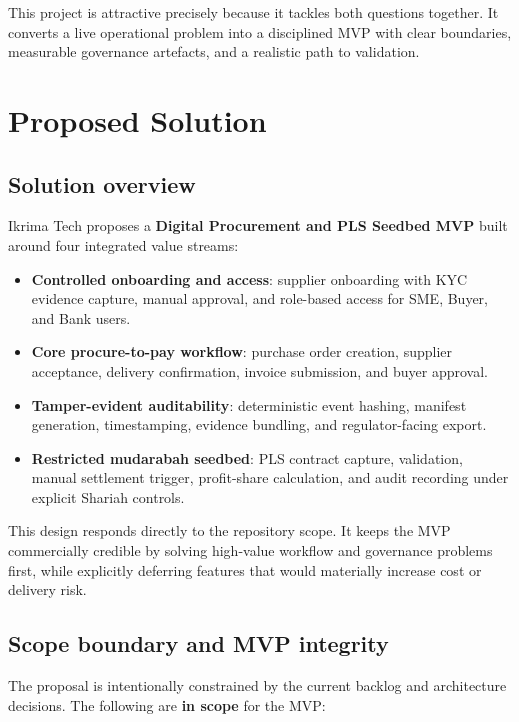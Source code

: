 \documentclass[11pt,a4paper]{article}
\begin{document}
This project is attractive precisely because it tackles both questions together. It converts a live operational problem into a disciplined MVP with clear boundaries, measurable governance artefacts, and a realistic path to validation.

\section{Proposed Solution}

\subsection{Solution overview}

Ikrima Tech proposes a \textbf{Digital Procurement and PLS Seedbed MVP} built around four integrated value streams:

\begin{itemize}
    \item \textbf{Controlled onboarding and access}: supplier onboarding with KYC evidence capture, manual approval, and role-based access for SME, Buyer, and Bank users.
    \item \textbf{Core procure-to-pay workflow}: purchase order creation, supplier acceptance, delivery confirmation, invoice submission, and buyer approval.
    \item \textbf{Tamper-evident auditability}: deterministic event hashing, manifest generation, timestamping, evidence bundling, and regulator-facing export.
    \item \textbf{Restricted mudarabah seedbed}: PLS contract capture, validation, manual settlement trigger, profit-share calculation, and audit recording under explicit Shariah controls.
\end{itemize}

This design responds directly to the repository scope. It keeps the MVP commercially credible by solving high-value workflow and governance problems first, while explicitly deferring features that would materially increase cost or delivery risk.

\subsection{Scope boundary and MVP integrity}

The proposal is intentionally constrained by the current backlog and architecture decisions. The following are \textbf{in scope} for the MVP:
\end{document}
